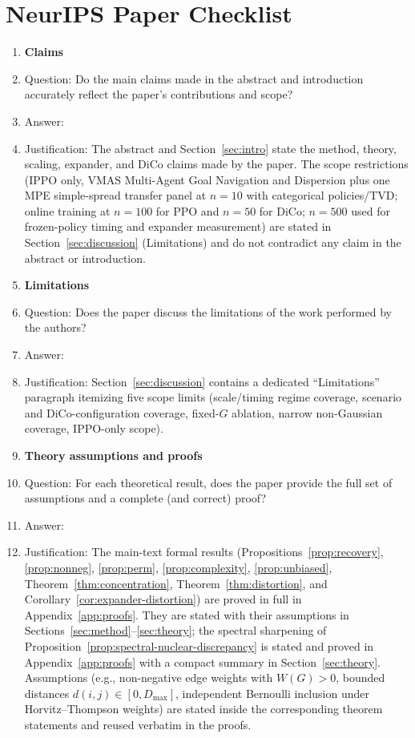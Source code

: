 \section*{NeurIPS Paper Checklist}

\begin{enumerate}

\item {\bf Claims}
    \item[] Question: Do the main claims made in the abstract and introduction accurately reflect the paper's contributions and scope?
    \item[] Answer: \answerYes{}
    \item[] Justification: The abstract and Section~\ref{sec:intro}
    state the method, theory, scaling, expander, and DiCo claims made
    by the paper. The scope restrictions (IPPO only, VMAS Multi-Agent
    Goal Navigation and Dispersion plus one MPE simple-spread transfer
    panel at $n{=}10$ with categorical policies/TVD; online training at
    $n{=}100$ for PPO and $n{=}50$ for DiCo; $n{=}500$ used for
    frozen-policy timing and expander measurement) are stated in
    Section~\ref{sec:discussion} (Limitations) and do not contradict
    any claim in the abstract or introduction.

\item {\bf Limitations}
    \item[] Question: Does the paper discuss the limitations of the work performed by the authors?
    \item[] Answer: \answerYes{}
    \item[] Justification: Section~\ref{sec:discussion} contains a
    dedicated ``Limitations'' paragraph itemizing five scope limits
    (scale/timing regime coverage, scenario and DiCo-configuration
    coverage, fixed-$G$ ablation, narrow non-Gaussian coverage,
    IPPO-only scope).

\item {\bf Theory assumptions and proofs}
    \item[] Question: For each theoretical result, does the paper provide the full set of assumptions and a complete (and correct) proof?
    \item[] Answer: \answerYes{}
    \item[] Justification: The main-text formal results
    (Propositions~\ref{prop:recovery}, \ref{prop:nonneg},
    \ref{prop:perm}, \ref{prop:complexity},
    \ref{prop:unbiased}, Theorem~\ref{thm:concentration},
    Theorem~\ref{thm:distortion}, and
    Corollary~\ref{cor:expander-distortion}) are proved in full in
    Appendix~\ref{app:proofs}. They are stated with their assumptions in
    Sections~\ref{sec:method}--\ref{sec:theory}; the spectral
    sharpening of Proposition~\ref{prop:spectral-nuclear-discrepancy}
    is stated and proved in Appendix~\ref{app:proofs} with a compact
    summary in Section~\ref{sec:theory}. Assumptions (e.g.,
    non-negative edge weights with $W(G)>0$, bounded distances
    $d(i,j)\in[0,D_{\max}]$, independent Bernoulli inclusion under
    Horvitz--Thompson weights) are stated inside the corresponding
    theorem statements and reused verbatim in the proofs.


\end{enumerate}
